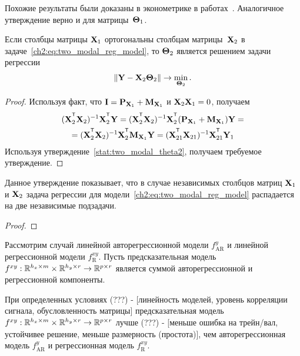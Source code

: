 Похожие результаты были доказаны в эконометрике в работах~\cite{frisch1933partial,lovell1963seasonal,cinelli2020making}. Аналогичное утверждение верно и для матрицы~$\boldsymbol{\Theta}_1$. 

\begin{statement}
	Если столбцы матрицы $\mathbf{X}_1$ ортогональны столбцам матрицы~$\mathbf{X}_2$ в задаче~\eqref{ch2:eq:two_modal_reg_model}, то $\boldsymbol{\Theta}_2$ является решением задачи регрессии
	\[
			\| \mathbf{Y} -  \mathbf{X}_{2} \boldsymbol{\Theta}_2 \| \rightarrow \min_{\boldsymbol{\Theta}_2}.
	\]
\end{statement}

\begin{proof}
	Используя факт, что $\mathbf{I} = \mathbf{P}_{\mathbf{X}_1} + \mathbf{M}_{\mathbf{X}_1}$ и $\mathbf{X}_2 \mathbf{X}_1 = 0$, получаем
	\begin{multline*}
		(\bX_2^{\T} \bX_2)^{-1} \bX_2^{\T} \bY = (\bX_2^{\T} \bX_2)^{-1} \bX_2^{\T} (\bP_{\bX_1} + \bM_{\bX_1}) \bY = \\ = (\bX_2^{\T} \bX_2)^{-1} \bX_2^{\T} \bM_{\bX_1} \bY  = (\bX_{21}^{\T} \bX_{21})^{-1} \bX_{21}^{\T} \bY_1
	\end{multline*}
	Используя утверждение~\autoref{stat:two_modal_theta2}, получаем требуемое утверждение.
\end{proof}
Данное утверждение показывает, что в случае независимых столбцов матриц $\mathbf{X}_1$ и $\mathbf{X}_2$ задача регрессии для модели~\eqref{ch2:eq:two_modal_reg_model} распадается на две независимые подзадачи.

\begin{statement}
	
\end{statement}

\begin{proof}

\end{proof}

Рассмотрим случай линейной авторегрессионной модели $f_{\text{AR}}^y$ и линейной регрессионной модели $f_{\text{R}}^{xy}$. Пусть предсказательная модель $f^{xy}: \mathbb{R}^{h_x \times m} \times \mathbb{R}^{h_y \times r} \rightarrow \mathbb{R}^{p \times r}$ является суммой авторегрессионной и регрессионной компоненты.

\begin{theorem}
	При определенных условиях (???) - [линейность моделей, уровень корреляции сигнала, обусловленность матрицы] предсказательная модель $f^{xy}: \mathbb{R}^{h_x \times m} \times \mathbb{R}^{h_y \times r} \rightarrow \mathbb{R}^{p \times r}$ лучше (???) - [меньше ошибка на трейн/вал, устойчивее решение, меньше размерность (простота)], чем авторегрессионная модель $f_{\text{AR}}^y$ и регрессионная модель $f_{\text{R}}^{xy}$.
\end{theorem}

